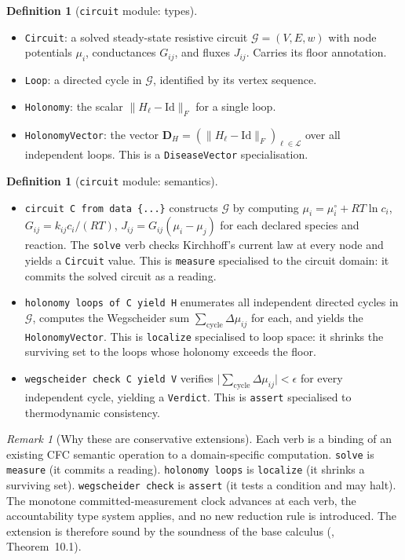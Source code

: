 \documentclass[11pt,a4paper]{article}
\theoremstyle{expthm}
\theoremstyle{definition}
\newtheorem{definition}[theorem]{Definition}
\theoremstyle{remark}
\newtheorem{remark}[theorem]{Remark}
\newcommand{\dvec}{\mathbf{D}}
\newcommand{\HolL}{H_\ell}
\newcommand{\Gcond}{\mathcal{G}}
\newcommand{\abs}[1]{\lvert#1\rvert}
\newcommand{\norm}[1]{\lVert#1\rVert}
\newcommand{\cf}[1]{\texttt{#1}}
\begin{document}
\begin{definition}[\cf{circuit} module: types]
\label{def:circuit-types}
\leavevmode
\begin{itemize}[leftmargin=1.4em,itemsep=2pt]
\item \cf{Circuit}: a solved steady-state resistive circuit
  $\Gcond=(V,E,w)$ with node potentials $\mu_i$, conductances $G_{ij}$,
  and fluxes $J_{ij}$. Carries its floor annotation.
\item \cf{Loop}: a directed cycle in $\Gcond$, identified by its vertex
  sequence.
\item \cf{Holonomy}: the scalar $\norm{\HolL - \mathrm{Id}}_F$ for a
  single loop.
\item \cf{HolonomyVector}: the vector
  $\dvec_H = (\norm{\HolL - \mathrm{Id}}_F)_{\ell \in \mathcal{L}}$
  over all independent loops. This is a \cf{DiseaseVector} specialisation.
\end{itemize}
\end{definition}

\begin{definition}[\cf{circuit} module: semantics]
\label{def:circuit-sem}
\leavevmode
\begin{itemize}[leftmargin=1.4em,itemsep=2pt]
\item \cf{circuit C from data \{...\}} constructs $\Gcond$ by computing
  $\mu_i = \mu_i^\circ + RT \ln c_i$, $G_{ij} = k_{ij} c_i / (RT)$,
  $J_{ij} = G_{ij}(\mu_i - \mu_j)$ for each declared species and
  reaction. The \cf{solve} verb checks Kirchhoff's current law at every
  node and yields a \cf{Circuit} value. This is \cf{measure} specialised
  to the circuit domain: it commits the solved circuit as a reading.
\item \cf{holonomy loops of C yield H} enumerates all independent directed
  cycles in $\Gcond$, computes the Wegscheider sum
  $\sum_{\text{cycle}} \Delta\mu_{ij}$ for each, and yields the
  \cf{HolonomyVector}. This is \cf{localize} specialised to loop space:
  it shrinks the surviving set to the loops whose holonomy exceeds the
  floor.
\item \cf{wegscheider check C yield V} verifies
  $\abs{\sum_{\text{cycle}} \Delta\mu_{ij}} < \epsilon$ for every
  independent cycle, yielding a \cf{Verdict}. This is \cf{assert}
  specialised to thermodynamic consistency.
\end{itemize}
\end{definition}

\begin{remark}[Why these are conservative extensions]
\label{rem:conservative-circuit}
Each verb is a binding of an existing CFC semantic operation to a
domain-specific computation. \cf{solve} is \cf{measure} (it commits a
reading). \cf{holonomy loops} is \cf{localize} (it shrinks a surviving
set). \cf{wegscheider check} is \cf{assert} (it tests a condition and
may halt). The monotone committed-measurement clock advances at each
verb, the accountability type system applies, and no new reduction rule
is introduced. The extension is therefore sound by the soundness of the
base calculus (\citep{sachikonye2026cfc}, Theorem~10.1).
\end{remark}
\end{document}
